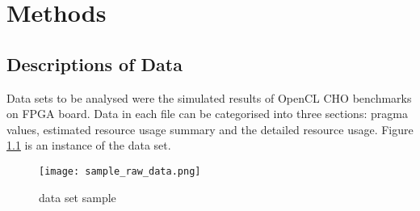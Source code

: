 \chapter{Methods}

\section{Descriptions of Data}
Data sets to be analysed were the simulated results of OpenCL CHO benchmarks on FPGA board. Data in each file can be categorised into three sections: pragma values, estimated resource usage summary and the detailed resource usage. Figure \ref{figure:sample_raw_data} is an instance of the data set.

\begin{figure}[h!]
\centering
\texttt{[image: sample\_raw\_data.png]}
\caption{data set sample}
\label{figure:sample_raw_data}
\end{figure}

